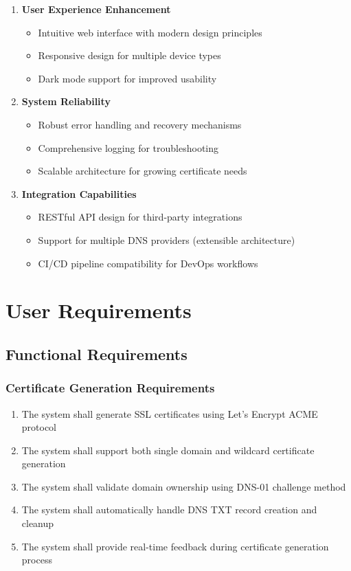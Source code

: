 \begin{enumerate}
    \item \textbf{User Experience Enhancement}
    \begin{itemize}
        \item Intuitive web interface with modern design principles
        \item Responsive design for multiple device types
        \item Dark mode support for improved usability
    \end{itemize}
    
    \item \textbf{System Reliability}
    \begin{itemize}
        \item Robust error handling and recovery mechanisms
        \item Comprehensive logging for troubleshooting
        \item Scalable architecture for growing certificate needs
    \end{itemize}
    
    \item \textbf{Integration Capabilities}
    \begin{itemize}
        \item RESTful API design for third-party integrations
        \item Support for multiple DNS providers (extensible architecture)
        \item CI/CD pipeline compatibility for DevOps workflows
    \end{itemize}
\end{enumerate}

\section{User Requirements}

\subsection{Functional Requirements}

\subsubsection{Certificate Generation Requirements}
\begin{enumerate}
    \item The system shall generate SSL certificates using Let's Encrypt ACME protocol
    \item The system shall support both single domain and wildcard certificate generation
    \item The system shall validate domain ownership using DNS-01 challenge method
    \item The system shall automatically handle DNS TXT record creation and cleanup
    \item The system shall provide real-time feedback during certificate generation process
\end{enumerate}

